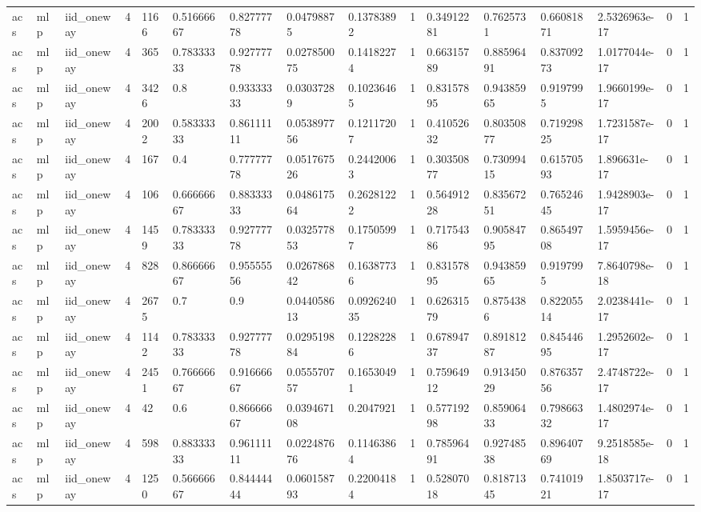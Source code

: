 \begin{tabular}{llllllllllllllll}
acs & mlp & iid\_oneway & 4 & 1166 & 0.51666667 & 0.82777778 & 0.04798875 & 0.13783892 & 1 & 0.34912281 & 0.7625731 & 0.66081871 & 2.5326963e-17 & 0 & 1 \\
acs & mlp & iid\_oneway & 4 & 365 & 0.78333333 & 0.92777778 & 0.027850075 & 0.14182274 & 1 & 0.66315789 & 0.88596491 & 0.83709273 & 1.0177044e-17 & 0 & 1 \\
acs & mlp & iid\_oneway & 4 & 3426 & 0.8 & 0.93333333 & 0.03037289 & 0.10236465 & 1 & 0.83157895 & 0.94385965 & 0.9197995 & 1.9660199e-17 & 0 & 1 \\
acs & mlp & iid\_oneway & 4 & 2002 & 0.58333333 & 0.86111111 & 0.053897756 & 0.12117207 & 1 & 0.41052632 & 0.80350877 & 0.71929825 & 1.7231587e-17 & 0 & 1 \\
acs & mlp & iid\_oneway & 4 & 167 & 0.4 & 0.77777778 & 0.051767526 & 0.24420063 & 1 & 0.30350877 & 0.73099415 & 0.61570593 & 1.896631e-17 & 0 & 1 \\
acs & mlp & iid\_oneway & 4 & 106 & 0.66666667 & 0.88333333 & 0.048617564 & 0.26281222 & 1 & 0.56491228 & 0.83567251 & 0.76524645 & 1.9428903e-17 & 0 & 1 \\
acs & mlp & iid\_oneway & 4 & 1459 & 0.78333333 & 0.92777778 & 0.032577853 & 0.17505997 & 1 & 0.71754386 & 0.90584795 & 0.86549708 & 1.5959456e-17 & 0 & 1 \\
acs & mlp & iid\_oneway & 4 & 828 & 0.86666667 & 0.95555556 & 0.026786842 & 0.16387736 & 1 & 0.83157895 & 0.94385965 & 0.9197995 & 7.8640798e-18 & 0 & 1 \\
acs & mlp & iid\_oneway & 4 & 2675 & 0.7 & 0.9 & 0.044058613 & 0.092624035 & 1 & 0.62631579 & 0.8754386 & 0.82205514 & 2.0238441e-17 & 0 & 1 \\
acs & mlp & iid\_oneway & 4 & 1142 & 0.78333333 & 0.92777778 & 0.029519884 & 0.12282286 & 1 & 0.67894737 & 0.89181287 & 0.84544695 & 1.2952602e-17 & 0 & 1 \\
acs & mlp & iid\_oneway & 4 & 2451 & 0.76666667 & 0.91666667 & 0.055570757 & 0.16530491 & 1 & 0.75964912 & 0.91345029 & 0.87635756 & 2.4748722e-17 & 0 & 1 \\
acs & mlp & iid\_oneway & 4 & 42 & 0.6 & 0.86666667 & 0.039467108 & 0.2047921 & 1 & 0.57719298 & 0.85906433 & 0.79866332 & 1.4802974e-17 & 0 & 1 \\
acs & mlp & iid\_oneway & 4 & 598 & 0.88333333 & 0.96111111 & 0.022487676 & 0.11463864 & 1 & 0.78596491 & 0.92748538 & 0.89640769 & 9.2518585e-18 & 0 & 1 \\
acs & mlp & iid\_oneway & 4 & 1250 & 0.56666667 & 0.84444444 & 0.060158793 & 0.22004184 & 1 & 0.52807018 & 0.81871345 & 0.74101921 & 1.8503717e-17 & 0 & 1 \\

\end{tabular}

